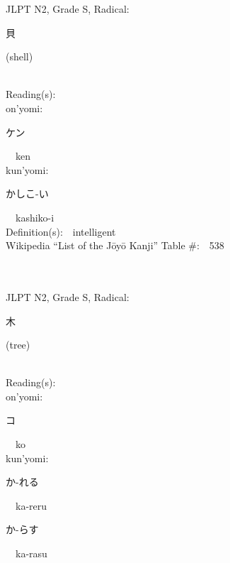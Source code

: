 \begin{multicols}{2}
{JLPT N2, Grade S, Radical:\ \ {\begin{CJK}{UTF8}{min} 貝 \end{CJK}} (shell) } \\
Reading(s):\ \ \\
{\hspace*{1em}}on'yomi:\ \ \\
{\hspace*{2em}}{\begin{CJK}{UTF8}{min} ケン \end{CJK}}\ \ ken\ \ \\
{\hspace*{1em}}kun'yomi:\ \ \\
{\hspace*{2em}}{\begin{CJK}{UTF8}{min} かしこ-い \end{CJK}}\ \ kashiko-i\ \ \\
Definition(s):\ \ intelligent \\
Wikipedia ``List of the J\=oy\=o Kanji'' Table \#:\ \ 538 \\
\ \ \\
{\fontsize{34pt}{40pt}  }\ \ \\  %
{JLPT N2, Grade S, Radical:\ \ {\begin{CJK}{UTF8}{min} 木 \end{CJK}} (tree) } \\
Reading(s):\ \ \\
{\hspace*{1em}}on'yomi:\ \ \\
{\hspace*{2em}}{\begin{CJK}{UTF8}{min} コ \end{CJK}}\ \ ko\ \ \\
{\hspace*{1em}}kun'yomi:\ \ \\
{\hspace*{2em}}{\begin{CJK}{UTF8}{min} か-れる \end{CJK}}\ \ ka-reru\ \ \\
{\hspace*{2em}}{\begin{CJK}{UTF8}{min} か-らす \end{CJK}}\ \ ka-rasu\ \ \\

\end{multicols}

